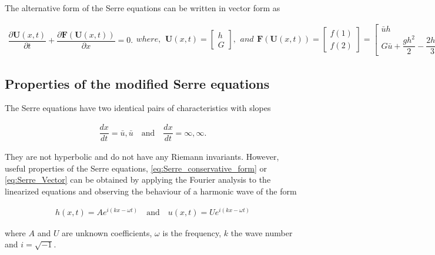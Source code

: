 \documentclass[SingleSpace,12pt]{Serre_ASCE}
\begin{document}
The alternative form of the Serre equations can be written in vector form as
\begin{linenomath*}
\begin{subequations}\label{eq:Serre_Vector}
\begin{gather}\label{eq:Serre_advection_equation}
\dfrac{\partial \mathbf{U}(x,t)}{\partial t} + \dfrac{\partial \mathbf{F}(\mathbf{U}(x,t))}{\partial x} = 0.
\end{gather}
where,
\begin{gather}\label{eq:Serre_conserved_quantity}
\textbf{U}(x,t) = \left[ \begin{array}{c} h \\ G
\end{array} \right],
\end{gather}
and
\begin{gather}\label{eq:Serre_flux}
\textbf{F}(\textbf{U}(x,t)) = \left [ \begin{array}{c} f(1) \\
f(2) \end{array} \right ] = \left[ \begin{array}{c} \bar{u}h \\
G\bar{u} + \dfrac{gh^2}{2} - \dfrac{2h^3}{3} \dfrac{\partial
\bar{u}}{\partial x} \dfrac{\partial \bar{u}}{\partial x}
\end{array} \right].
\end{gather}
\end{subequations}
\end{linenomath*}

\subsection{Properties of the modified Serre equations}

The Serre equations have two identical pairs of characteristics with slopes
\begin{linenomath*}
\begin{gather*}
\dfrac{dx}{dt} = \bar{u}, \bar{u} \quad\text{and} \quad \dfrac{dx}{dt} = \infty, \infty.
\end{gather*}
\end{linenomath*}
They are not hyperbolic and do not have any Riemann invariants. However, useful properties of the Serre equations,  \eqref{eq:Serre_conservative_form} or \eqref{eq:Serre_Vector} can be obtained by applying the Fourier analysis to the linearized equations and observing the behaviour of a harmonic wave of the form
\begin{linenomath*}
\begin{gather}\label{eq:Fourier_components}
h(x,t) = A e^{i(kx - \omega t)} \quad \text{and} \quad u(x,t) = U e^{i(kx - \omega t)}
\end{gather}
\end{linenomath*}
where $A$ and $U$ are unknown coefficients, $\omega$ is the frequency, $k$ the wave number and $i = \sqrt{-1}$.
\end{document}
